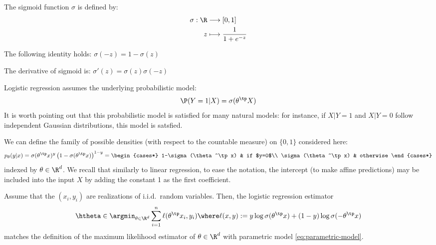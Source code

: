 \documentclass[toc, titlepaged]{../cs-classes/cs-classes}
\begin{document}
\begin{definition}
    The sigmoid function $\sigma$ is defined by:
    \begin{equation}
        \begin{aligned}
            \sigma : \R &\longrightarrow [0, 1]\\
            z &\longmapsto \frac{1}{1+e^{-z}}
        \end{aligned}
    \end{equation}
\end{definition}

\begin{property}
    The following identity holds: $\sigma(-z)=1-\sigma(z)$
\end{property}

\begin{property}
    The derivative of sigmoid is: $\sigma'(z)=\sigma(z)\sigma(-z)$
\end{property}

Logistic regression assumes the underlying probabilistic model:
\begin{equation*}
    \P(Y=1|X)=\sigma(\theta^\tp X)
\end{equation*}
It is worth pointing out that this probabilistic model is satisfied for many natural models: for instance, if $X|Y=1$ and $X|Y=0$ follow independent Gaussian distributions, this model is satsfied.

We can define the family of possible densities (with respect to the countable measure) on $\{0, 1\}$ considered here:
\begin{equation}
    \label{eq:parametric-model}
    p_\theta(y|x) = \sigma(\theta^\tp x)^y\left(1-\sigma(\theta^\tp x)\right)^{1-y} = \begin{cases*}
        1-\sigma(\theta^\tp x) & if $y=0$\\
        \sigma(\theta^\tp x) & otherwise
    \end{cases*}
\end{equation}
indexed by $\theta\in\R^d$. We recall that similarly to linear regression, to ease the notation, the intercept (to make affine predictions) may be included into the input $X$ by adding the constant 1 as the first coefficient.

\begin{property}
    Assume that the $(x_i, y_i)$ are realizations of i.i.d.~random variables. Then, the logistic regression estimator \begin{equation*}
        \htheta \in\argmin_{\theta\in\R^d} \sum_{i=1}^n \ell(\theta^\tp x_i, y_i) \where \ell(x, y) := y\log\sigma(\theta^\tp x) + (1-y)\log\sigma(-\theta^\tp x)
    \end{equation*}
    matches the definition of the maximum likelihood estimator of $\theta\in\R^d$ with parametric model \eqref{eq:parametric-model}.
\end{property}
\end{document}
